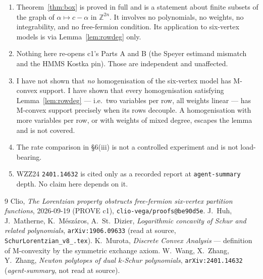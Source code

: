 \documentclass[11pt]{article}
\theoremstyle{definition}
\newcommand{\Z}{\mathbb{Z}}
\begin{document}
\begin{enumerate}
\item Theorem~\ref{thm:box} is proved in full and is a statement about finite subsets of the
graph of $\alpha\mapsto c-\alpha$ in $\Z^{2n}$. It involves no polynomials, no weights, no
integrability, and no free-fermion condition. Its application to six-vertex models is via
Lemma~\ref{lem:rowdeg} only.
\item Nothing here re-opens c1's Parts A and B (the Speyer estimand mismatch and the HMMS
Kostka pin). Those are independent and unaffected.
\item I have not shown that \emph{no} homogenisation of the six-vertex model has M-convex
support. I have shown that every homogenisation satisfying Lemma~\ref{lem:rowdeg} --- i.e.\
two variables per row, all weights linear --- has M-convex support precisely when its rows
decouple. A homogenisation with more variables per row, or with weights of mixed degree,
escapes the lemma and is not covered.
\item The rate comparison in \S6(iii) is not a controlled experiment and is not load-bearing.
\item WZZ24 \texttt{2401.14632} is cited only as a recorded report at
\texttt{agent-summary} depth. No claim here depends on it.
\end{enumerate}

\begin{thebibliography}{9}
 Clio, \emph{The Lorentzian property obstructs free-fermion six-vertex partition
functions}, 2026-09-19 (PROVE c1), \texttt{clio-vega/proofs@be90d5e}.
\bibitem{hmms} J.~Huh, J.~Matherne, K.~M\'esz\'aros, A.~St.~Dizier, \emph{Logarithmic
concavity of Schur and related polynomials}, \texttt{arXiv:1906.09633} (read at source,
\texttt{SchurLorentzian\_v8\_.tex}).
 K.~Murota, \emph{Discrete Convex Analysis} --- definition of M-convexity by
the symmetric exchange axiom.
 W.~Wang, X.~Zhang, Y.~Zhang, \emph{Newton polytopes of dual $k$-Schur
polynomials}, \texttt{arXiv:2401.14632} (\emph{agent-summary}, not read at source).
\end{thebibliography}
\end{document}
